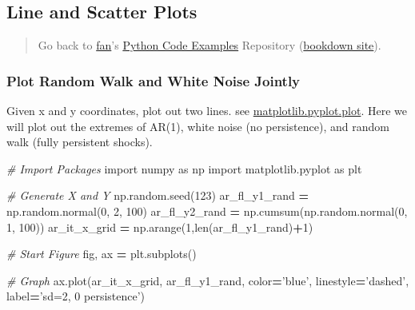 \documentclass[
]{book}
\newenvironment{Shaded}{\begin{snugshade}}{\end{snugshade}}
\newcommand{\BuiltInTok}[1]{#1}
\newcommand{\CommentTok}[1]{\textcolor[rgb]{0.56,0.35,0.01}{\textit{#1}}}
\newcommand{\DecValTok}[1]{\textcolor[rgb]{0.00,0.00,0.81}{#1}}
\newcommand{\ImportTok}[1]{#1}
\newcommand{\NormalTok}[1]{#1}
\newcommand{\OperatorTok}[1]{\textcolor[rgb]{0.81,0.36,0.00}{\textbf{#1}}}
\newcommand{\StringTok}[1]{\textcolor[rgb]{0.31,0.60,0.02}{#1}}
\begin{document}
\hypertarget{line-and-scatter-plots}{%
\subsection{Line and Scatter Plots}\label{line-and-scatter-plots}}

\begin{quote}
Go back to \href{http://fanwangecon.github.io/}{fan}'s \href{https://fanwangecon.github.io/pyfan/}{Python Code Examples} Repository (\href{https://fanwangecon.github.io/pyfan/bookdown}{bookdown site}).
\end{quote}

\hypertarget{plot-random-walk-and-white-noise-jointly}{%
\subsubsection{Plot Random Walk and White Noise Jointly}\label{plot-random-walk-and-white-noise-jointly}}

Given x and y coordinates, plot out two lines. see \href{https://matplotlib.org/2.1.1/api/_as_gen/matplotlib.pyplot.plot.html}{matplotlib.pyplot.plot}. Here we will plot out the extremes of AR(1), white noise (no persistence), and random walk (fully persistent shocks).

\begin{Shaded}
\begin{Highlighting}[]
\CommentTok{# Import Packages}
\ImportTok{import}\NormalTok{ numpy }\ImportTok{as}\NormalTok{ np}
\ImportTok{import}\NormalTok{ matplotlib.pyplot }\ImportTok{as}\NormalTok{ plt}

\CommentTok{# Generate X and Y}
\NormalTok{np.random.seed(}\DecValTok{123}\NormalTok{)}
\NormalTok{ar_fl_y1_rand }\OperatorTok{=}\NormalTok{ np.random.normal(}\DecValTok{0}\NormalTok{, }\DecValTok{2}\NormalTok{, }\DecValTok{100}\NormalTok{)}
\NormalTok{ar_fl_y2_rand }\OperatorTok{=}\NormalTok{ np.cumsum(np.random.normal(}\DecValTok{0}\NormalTok{, }\DecValTok{1}\NormalTok{, }\DecValTok{100}\NormalTok{))}
\NormalTok{ar_it_x_grid }\OperatorTok{=}\NormalTok{ np.arange(}\DecValTok{1}\NormalTok{,}\BuiltInTok{len}\NormalTok{(ar_fl_y1_rand)}\OperatorTok{+}\DecValTok{1}\NormalTok{)}

\CommentTok{# Start Figure}
\NormalTok{fig, ax }\OperatorTok{=}\NormalTok{ plt.subplots()}

\CommentTok{# Graph}
\NormalTok{ax.plot(ar_it_x_grid, ar_fl_y1_rand,}
\NormalTok{                     color}\OperatorTok{=}\StringTok{'blue'}\NormalTok{, linestyle}\OperatorTok{=}\StringTok{'dashed'}\NormalTok{,}
\NormalTok{                     label}\OperatorTok{=}\StringTok{'sd=2, 0 persistence'}\NormalTok{)}
\end{Highlighting}
\end{Shaded}
\end{document}
